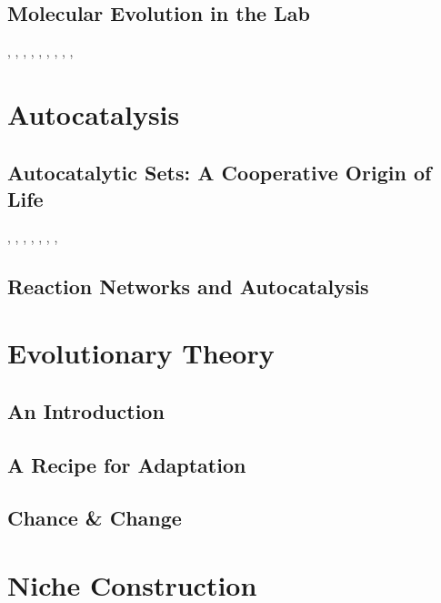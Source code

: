 \documentclass[]{article}
\begin{document}
\subsection{Molecular Evolution in the Lab}

\cite{joyce2007forty}, \cite{seelig2007selection}, \cite{chen2007ribozyme}, \cite{gold2012aptamers}, \cite{sefah2014vitro}, \cite{pinheiro2012synthetic}, \cite{mansy2007structure}, \cite{bartel1993isolation}, \cite{petrie2014limits}, \cite{pressman2019mapping}

\section{Autocatalysis}

\subsection{Autocatalytic Sets: A Cooperative Origin of Life}
\cite{wim2017origin}, \cite{hordijk2017chasing}, \cite{wim2019wandering}, \cite{patzke2007self}, \cite{vaidya2012spontaneous}, \cite{ashkenasy2004design}, \cite{hordijk2012structure}, \cite{sousa2015autocatalytic}

\subsection{Reaction Networks and Autocatalysis}

\section{Evolutionary Theory}

\subsection{An Introduction}

\subsection{A Recipe for Adaptation}

\subsection{Chance \& Change}

\section{Niche Construction}


\printglossaries

 


\end{document}
